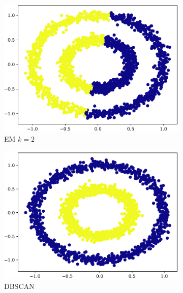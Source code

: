 \begin{figure}[t!]
\begin{subfigure}[b]{0.45\textwidth}
        \includegraphics[width=\textwidth]{../plots/circle_em.pdf}
        \caption{EM $k = 2$}
        \label{subfig:circle-em}
    \end{subfigure}
    \hspace{0.09\textwidth}
    \begin{subfigure}[b]{0.45\textwidth}
        \includegraphics[width=\textwidth]{../plots/circle_dbscan.pdf}
        \caption{DBSCAN}
        \label{subfig:circle-dbscan}
    \end{subfigure}
    \begin{subfigure}[b]{0.45\textwidth}

\end{subfigure}
\end{figure}
